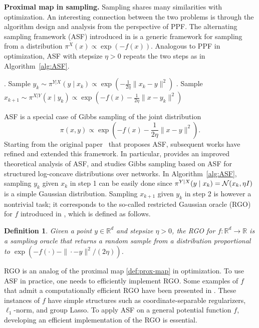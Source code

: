 \documentclass[11pt,letterpaper]{article}
\newtheorem{definition}[thm]{Definition}
\newcommand{\R}{\mathbb{R}}
\begin{document}
{\bf Proximal map in sampling.} Sampling shares many similarities with optimization. An interesting connection between the two problems is through the algorithm design and analysis from the perspective of PPF.
The alternating sampling framework (ASF) introduced in \cite{lee2021structured} is a generic framework for sampling from a distribution $\pi^X(x) \propto \exp(-f(x))$.
Analogous to PPF in optimization, ASF with stepsize $\eta>0$ repeats the two steps as in Algorithm~\ref{alg:ASF}.
\begin{algorithm}[H]
	\caption{Alternating Sampling Framework \cite{lee2021structured}}
	\label{alg:ASF}
	\begin{algorithmic}
		. Sample $y_{k}\sim \pi^{Y|X}(y\mid x_k) \propto \exp\left(-\frac{1}{2\eta}\|x_k-y\|^2\right)$
		. Sample $x_{k+1}\sim \pi^{X|Y}(x \mid y_{k}) \propto \exp\left(-f(x)-\frac{1}{2\eta}\|x-y_{k}\|^2\right)$
	\end{algorithmic}
\end{algorithm}
ASF is a special case of Gibbs sampling \cite{GemGem84} of the joint distribution 
    \[
        \pi(x,y) \propto \exp\left(-f(x)-\frac{1}{2\eta}\|x-y\|^2\right).
    \]
Starting from the original paper~\cite{lee2021structured} that proposes ASF, subsequent works have refined and extended this framework. In particular, \cite{chen2022improved} provides an improved theoretical analysis of ASF, and \cite{yuan2023class} studies Gibbs sampling based on ASF for structured log-concave distributions over networks.
In Algorithm~\ref{alg:ASF}, sampling $y_k$ given $x_k$ in step 1 can be easily done since $\pi^{Y|X}(y\mid x_k) = {\cal N}(x_k,\eta I)$ is a simple Gaussian distribution.
Sampling $x_{k+1}$ given $y_k$ in step 2 is however a nontrivial task; it corresponds to the so-called restricted Gaussian oracle (RGO) for $f$ introduced in \cite{lee2021structured}, which is defined as follows.

\begin{definition}
Given a point $y\in \R^d$ and stepsize $\eta >0$, the RGO for $f:\R^d\to \R$ is a sampling oracle that returns a random sample from a distribution proportional to $\exp(-f(\cdot) - \|\cdot-y\|^2/(2\eta))$.
\end{definition}

RGO is an analog of the proximal map \eqref{def:prox-map} in optimization.
To use ASF in practice, one needs to efficiently implement RGO. Some examples of $f$ that admit a computationally efficient RGO have been presented in \cite{mou2019efficient,shen2020composite}. These instances of $f$ have simple structures such as coordinate-separable regularizers, $\ell_1$-norm, and group Lasso. To apply ASF on a general potential function $f$, developing an efficient implementation of the RGO is essential.
\end{document}
